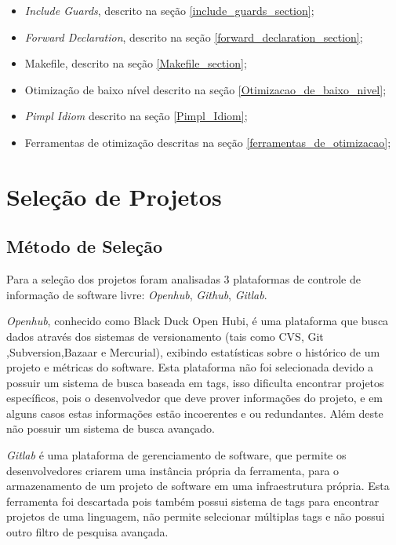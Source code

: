 \begin{itemize}
	\item \textit{Include Guards}, descrito na seção
 \ref{include_guards_section};
	\item \textit{Forward Declaration}, descrito na seção
 \ref{forward_declaration_section};
	\item Makefile, descrito na seção
 \ref{Makefile_section};
	\item Otimização de baixo nível descrito na seção
 \ref{Otimizacao_de_baixo_nivel};
	\item \textit{Pimpl Idiom} descrito na seção
 \ref{Pimpl_Idiom};
	\item Ferramentas de otimização descritas na seção
 \ref{ferramentas_de_otimizacao};
\end{itemize}

\section{Seleção de Projetos}

\subsection{Método de Seleção}

Para a seleção dos projetos foram analisadas 3 plataformas de controle de informação
de software livre: \textit{Openhub}, \textit{Github}, \textit{Gitlab}.

\textit{Openhub}, conhecido como Black Duck Open Hubi, é uma plataforma que busca dados através
 dos sistemas de versionamento (tais como CVS, Git ,Subversion,Bazaar e Mercurial),
 exibindo estatísticas sobre o histórico de um projeto e métricas do software.
 Esta plataforma não foi selecionada devido a possuir um sistema de busca baseada em tags,
 isso dificulta encontrar projetos específicos, pois o desenvolvedor que deve prover
 informações do projeto, e em alguns casos estas informações estão incoerentes e ou
 redundantes. Além deste não possuir um sistema de busca avançado.

\textit{Gitlab} é uma plataforma de gerenciamento de software, que permite os
 desenvolvedores criarem uma instância própria da ferramenta, para o armazenamento
 de um projeto de software em uma infraestrutura própria. Esta ferramenta foi
 descartada pois também possui sistema de tags para encontrar projetos de uma linguagem,
não permite selecionar múltiplas tags e não possui outro filtro de pesquisa avançada.


